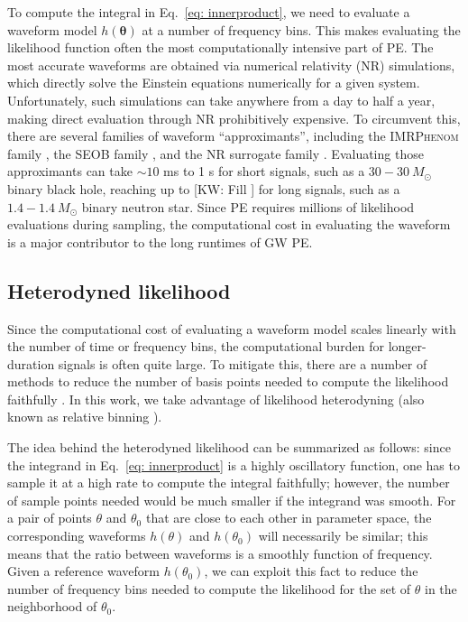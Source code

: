 \documentclass[twocolumn]{aastex631}
\newcommand{\kw}[1]{{\color{rb4}[KW: #1 ]}}
\begin{document}
To compute the integral in Eq.~\eqref{eq: innerproduct}, we need to evaluate a
waveform model $h(\mathbf{\theta})$ at a number of frequency bins. This makes
evaluating the likelihood function often the most computationally intensive
part of PE. The most accurate waveforms are obtained via numerical relativity
(NR) simulations, which directly solve the Einstein equations numerically for a
given system. Unfortunately, such simulations can take anywhere from a day to
half a year, making direct evaluation through NR prohibitively expensive. To
circumvent this, there are several families of waveform ``approximants'',
including the \textsc{IMRPhenom} family \cite{Khan:2015jqa,
Garcia-Quiros:2020qpx}, the \textsc{SEOB} family \cite{PhysRevD.89.061502}, and
the NR surrogate family \cite{Varma:2019csw}. Evaluating those approximants can
take ${\sim}10$ ms to 1 s for short signals, such as a $30-30\ M_{\odot}$
binary black hole, reaching up to \kw{Fill} for long signals, such as a
$1.4-1.4\ M_{\odot}$ binary neutron star.  Since PE requires millions of
likelihood evaluations during sampling, the computational cost in evaluating
the waveform is a major contributor to the long runtimes of GW PE.

\subsection{Heterodyned likelihood}

Since the computational cost of evaluating a waveform model scales linearly
with the number of time or frequency bins, the computational burden for
longer-duration signals is often quite large. To mitigate this, there are a
number of methods to reduce the number of basis points needed to compute the
likelihood faithfully \cite{Field:2011mf, Field:2013cfa, Smith:2016qas,
Vinciguerra:2017ngf,Morisaki:2020oqk,Morisaki:2021ngj}. In this work, we take advantage of likelihood
heterodyning \cite{Cornish:2010kf,Cornish:2021lje} (also known as relative binning
\cite{Zackay:2018qdy}).

The idea behind the heterodyned likelihood can be summarized as follows: since
the integrand in Eq.~\eqref{eq: innerproduct} is a highly oscillatory function,
one has to sample it at a high rate to compute the integral faithfully;
however, the number of sample points needed would be much smaller if the
integrand was smooth. For a pair of points $\theta$ and $\theta_0$ that are
close to each other in parameter space, the corresponding waveforms $h(\theta)$
and $h(\theta_0)$ will necessarily be similar; this means that the ratio
between waveforms is a smoothly function of frequency. Given a reference
waveform $h(\theta_0)$, we can exploit this fact to reduce the number of
frequency bins needed to compute the likelihood for the set of $\theta$ in the
neighborhood of $\theta_0$.
\end{document}

